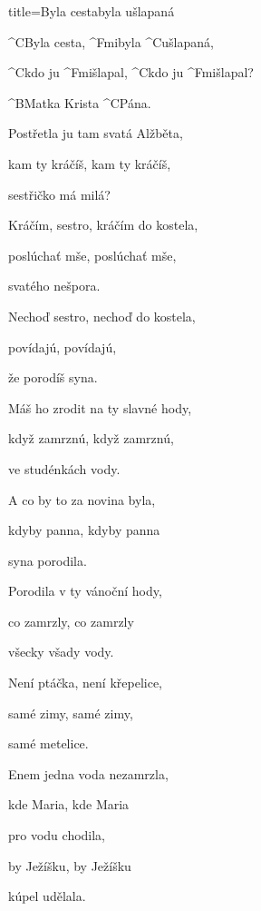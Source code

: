 \begin{song}{title=\predtitle\centering Byla cesta\carka byla ušlapaná \\\large   \vspace*{-0.3cm}}  %
\begin{centerjustified}
\nejvetsi

\sloka
	^{C}Byla cesta, ^{Fmi}byla ^{C}ušlapaná,
	
	^{C}kdo ju ^{Fmi}šlapal, ^{C}kdo ju ^{Fmi}šlapal?

	^{B}Matka Krista ^{C}Pána.

\sloka
	Postřetla ju tam svatá Alžběta,

	kam ty kráčíš, kam ty kráčíš,
	
	sestřičko má milá?

\sloka
	Kráčím, sestro, kráčím do kostela,
	
	poslúchať mše, poslúchať mše,
	
	svatého nešpora.


\sloka
	Nechoď sestro, nechoď do kostela,
	
	povídajú, povídajú,
	
	že porodíš syna.


\sloka
	Máš ho zrodit na ty slavné hody,
	
	když zamrznú, když zamrznú,
	
	ve studénkách vody.

\sloka
	A co by to za novina byla,
	
	kdyby panna, kdyby panna
	
	syna porodila.

\sloka
	Porodila v ty vánoční hody,
	
	co zamrzly, co zamrzly
	
	všecky všady vody.

\sloka
	Není ptáčka, není křepelice,
	
	samé zimy, samé zimy,
	
	samé metelice.

\sloka
	Enem jedna voda nezamrzla,
	
	kde Maria, kde Maria
	
	pro vodu chodila,
	
	by Ježíšku, by Ježíšku
	
	kúpel udělala.



\end{centerjustified}
\setcounter{Slokočet}{0}
\end{song}


